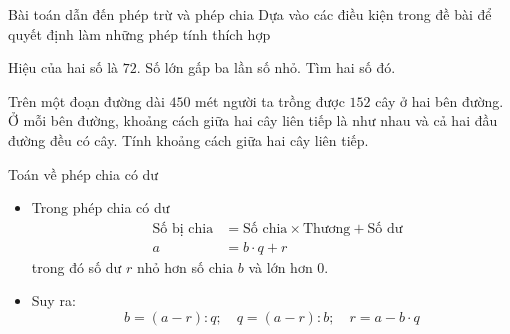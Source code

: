 \begin{dang}{Bài toán dẫn đến phép trừ và phép chia}
	Dựa vào các điều kiện trong đề bài để quyết định làm những phép tính thích hợp
\end{dang}
\begin{vd}%
	Hiệu của hai số là $72$. Số lớn gấp ba lần số nhỏ. Tìm hai số đó.
\end{vd}
\begin{vd}%
	Trên một đoạn đường dài $450$ mét người ta trồng được $152$ cây ở hai bên đường. Ở mỗi bên đường, khoảng cách giữa hai cây liên tiếp là như nhau và cả hai đầu đường đều có cây. Tính khoảng cách giữa hai cây liên tiếp.
\end{vd}
\begin{dang}{Toán về phép chia có dư}
	\begin{itemize}
		\item Trong phép chia có dư
		\begin{eqnarray*}
			&\mbox{Số bị chia} & =  \mbox{Số chia} \times \mbox{Thương} + \mbox{Số dư}\\
			&a & =  b \cdot q + r
		\end{eqnarray*}
	trong đó số dư $r$ nhỏ hơn số chia $b$ và lớn hơn $0$.
	\item Suy ra:
	$$b = \left( a - r\right) : q;\quad q = \left( a - r\right) : b;\quad r = a - b\cdot q$$
	\end{itemize}
\end{dang}

